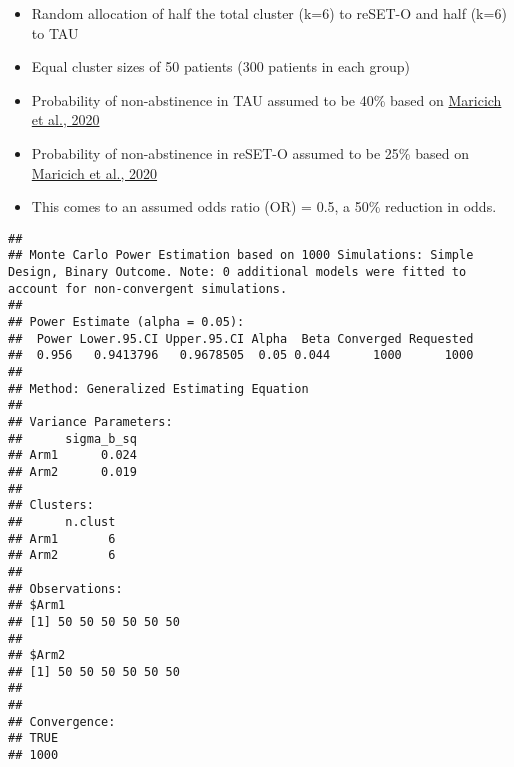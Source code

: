 \documentclass[
]{article}
\newenvironment{Shaded}{\begin{snugshade}}{\end{snugshade}}
\newcommand{\CommentTok}[1]{\textcolor[rgb]{0.56,0.35,0.01}{\textit{#1}}}
\newcommand{\KeywordTok}[1]{\textcolor[rgb]{0.13,0.29,0.53}{\textbf{#1}}}
\newcommand{\NormalTok}[1]{#1}
\newcommand{\StringTok}[1]{\textcolor[rgb]{0.31,0.60,0.02}{#1}}
\providecommand{\tightlist}{%
  \setlength{\itemsep}{0pt}\setlength{\parskip}{0pt}}
\begin{document}
\begin{itemize}
\tightlist
\item
  Random allocation of half the total cluster (k=6) to reSET-O and half
  (k=6) to TAU
\item
  Equal cluster sizes of 50 patients (300 patients in each group)
\item
  Probability of non-abstinence in TAU assumed to be 40\% based on
  \href{https://www.tandfonline.com/doi/full/10.1080/03007995.2020.1846022}{Maricich
  et al., 2020}
\item
  Probability of non-abstinence in reSET-O assumed to be 25\% based on
  \href{https://www.tandfonline.com/doi/full/10.1080/03007995.2020.1846022}{Maricich
  et al., 2020}
\item
  This comes to an assumed odds ratio (OR) = 0.5, a 50\% reduction in
  odds.
\end{itemize}

\begin{Shaded}
\end{Shaded}

\begin{verbatim}
## 
## Monte Carlo Power Estimation based on 1000 Simulations: Simple Design, Binary Outcome. Note: 0 additional models were fitted to account for non-convergent simulations.
## 
## Power Estimate (alpha = 0.05):
##  Power Lower.95.CI Upper.95.CI Alpha  Beta Converged Requested
##  0.956   0.9413796   0.9678505  0.05 0.044      1000      1000
## 
## Method: Generalized Estimating Equation 
## 
## Variance Parameters:
##      sigma_b_sq
## Arm1      0.024
## Arm2      0.019
## 
## Clusters:
##      n.clust
## Arm1       6
## Arm2       6
## 
## Observations:
## $Arm1
## [1] 50 50 50 50 50 50
## 
## $Arm2
## [1] 50 50 50 50 50 50
## 
## 
## Convergence:
## TRUE 
## 1000
\end{verbatim}
\end{document}
